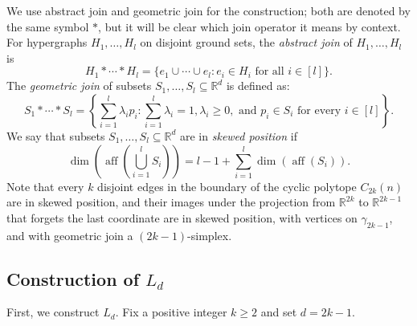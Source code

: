 \documentclass{article}
\newcommand{\RR}{\mathbb{R}}
\theoremstyle{definition}
\DeclareMathOperator{\aff}{aff}
\begin{document}
We use abstract join and geometric join for the construction; both are denoted by the same symbol $*$, but it will be clear which join operator it means by context.
For hypergraphs $H_1, \dots, H_l$ on disjoint ground sets, the \textit{abstract join} of $H_1, \dots, H_l$ is
\[H_1*\cdots *H_l=\{e_1 \cup \cdots \cup e_l: e_i \in H_i \textrm{ for all $i\in [l]$}\}.\]
The \textit{geometric join} of subsets $S_1, \dots, S_l\subseteq \RR^d$ is defined as: 
\[S_1* \cdots * S_l=\left\{\sum_{i=1}^l \lambda_i p_i: \sum_{i=1}^l \lambda_i=1, \lambda_i\geq 0, \textrm{ and } p_i \in S_i \textrm{ for every $i \in [l]$}\right\}.\]
We say that subsets $S_1, \dots, S_l\subseteq \RR^d$ are in \textit{skewed position} if
\[\dim\left(\aff\left(\bigcup_{i=1}^lS_i\right)\right)=l-1+\sum_{i=1}^l \dim(\aff(S_i)).\]
Note that every $k$ disjoint edges in the boundary of the cyclic polytope $C_{2k}(n)$ are in skewed position, 
and their images under the projection from $\RR^{2k}$ to $\RR^{2k-1}$ that forgets the last coordinate are in skewed position, with vertices on $\gamma_{2k-1}$, and with geometric join a $(2k-1)$-simplex.    



\subsection{Construction of \texorpdfstring{$L_d$}{Ld}}
First, we construct $L_d$. Fix a positive integer $k \geq 2$ and set $d=2k-1$.
\end{document}
